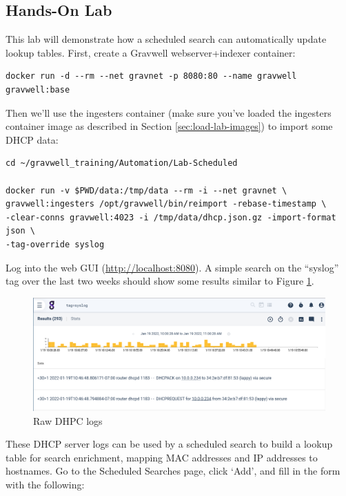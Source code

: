 \subsection{Hands-On Lab}

This lab will demonstrate how a scheduled search can automatically
update lookup tables. First, create a Gravwell webserver+indexer
container:

\begin{Verbatim}[breaklines=true]
docker run -d --rm --net gravnet -p 8080:80 --name gravwell gravwell:base
\end{Verbatim}

Then we'll use the ingesters container (make sure you've loaded the ingesters container image as described in Section \ref{sec:load-lab-images}) to import some DHCP data:

\begin{Verbatim}[breaklines=true]
cd ~/gravwell_training/Automation/Lab-Scheduled

docker run -v $PWD/data:/tmp/data --rm -i --net gravnet \
gravwell:ingesters /opt/gravwell/bin/reimport -rebase-timestamp \
-clear-conns gravwell:4023 -i /tmp/data/dhcp.json.gz -import-format json \
-tag-override syslog
\end{Verbatim}

Log into the web GUI (\href{http://localhost:8080}{http://localhost:8080}).
 A simple search on the ``syslog'' tag over the last two weeks should show some results
similar to Figure \ref{fig:dhcp-data}.

\begin{figure}
	\includegraphics{images/dhcp-data.png}
	\caption{Raw DHPC logs}
	\label{fig:dhcp-data}
\end{figure}

These DHCP server logs can be used by a scheduled search to build a
lookup table for search enrichment, mapping MAC addresses and IP
addresses to hostnames. Go to the Scheduled Searches page, click `Add',
and fill in the form with the following:

